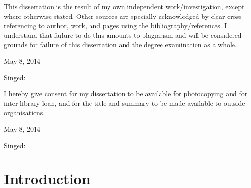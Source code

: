 \documentclass[11pt,a4paper, notitlepage]{report}
\begin{document}
 \newline

\noindent This dissertation is the result of my own independent work/investigation, except where otherwise stated. Other sources are specially acknowledged by clear cross referencing to author, work, and pages using the bibliography/references. I understand that failure to do this amounts to plagiarism and will be considered grounds for failure of this dissertation and the degree examination as a whole.\newline

May 8, 2014 \newline

Singed: \newline
\newline

 \newline

\noindent I hereby give consent for my dissertation to be available for photocopying and for inter-library loan,
and for the title and summary to be made available to outside organisations.\newline

May 8, 2014 \newline

Singed:
\tableofcontents

















































\chapter{Introduction}
\label{cha:Introduction}
\end{document}

